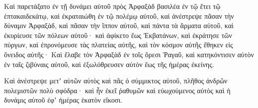 {\par }{\PP {}Καὶ παρετάξατο ἐν τῇ δυνάμει αὐτοῦ πρὸς Ἀρφαξὰδ βασιλέα ἐν τῷ ἔτει τῷ ἑπτακαιδεκάτῳ, καὶ ἐκραταιώθη ἐν τῷ πολέμῳ αὐτοῦ, καὶ ἀνέστρεψε πᾶσαν τὴν δύναμιν Ἀρφαξὰδ, καὶ πᾶσαν τὴν ἵππον αὐτοῦ, καὶ πάντα τὰ ἅρματα αὐτοῦ,
καὶ ἐκυρίευσε τῶν πόλεων αὐτοῦ· καὶ ἀφίκετο ἕως Ἐκβατάνων, καὶ ἐκράτησε τῶν πύργων, καὶ ἐπρονόμευσε τὰς πλατείας αὐτῆς, καὶ τὸν κόσμον αὐτῆς ἔθηκεν εἰς ὄνειδος αὐτῆς·
Καὶ ἔλαβε τὸν Ἀρφαξὰδ ἐν τοῖς ὄρεσι Ῥαγαῦ, καὶ κατηκόντισεν αὐτὸν ἐν ταῖς ζιβύναις αὐτοῦ, καὶ ἐξωλόθρευσεν αὐτὸν ἕως τῆς ἡμέρας ἐκείνης.
\par }{\PP {}Καὶ ἀνέστρεψε μετʼ αὐτῶν αὐτὸς καὶ πᾶς ὁ σύμμικτος αὐτοῦ, πλῆθος ἀνδρῶν πολεμιστῶν πολὺ σφόδρα· καὶ ἦν ἐκεῖ ῥαθυμῶν καὶ εὐωχούμενος αὐτὸς καὶ ἡ δυνάμις αὐτοῦ ἐφʼ ἡμέρας ἑκατὸν εἴκοσι.

}
